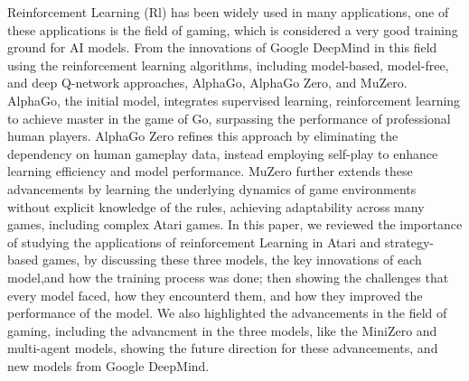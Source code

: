 Reinforcement Learning (Rl) has been widely used in many applications, one of
these applications is the field of gaming, which is considered a very good
training ground for AI models. From the innovations of Google DeepMind in this
field using the reinforcement learning algorithms, including model-based,
model-free, and deep Q-network approaches, AlphaGo, AlphaGo Zero, and MuZero.
AlphaGo, the initial model, integrates supervised learning, reinforcement
learning to achieve master in the game of Go, surpassing the performance of
professional human players. AlphaGo Zero refines this approach by eliminating
the dependency on human gameplay data, instead employing self-play to enhance
learning efficiency and model performance. MuZero further extends these
advancements by learning the underlying dynamics of game environments without
explicit knowledge of the rules, achieving adaptability across many games,
including complex Atari games. In this paper, we reviewed the importance of
studying the applications of reinforcement Learning in Atari and strategy-based
games, by discussing these three models, the key innovations of each model,and
how the training process was done; then showing the challenges that every model
faced, how they encounterd them, and how they improved the performance of the
model. We also highlighted the advancements in the field of gaming, including
the advancment in the three models, like the MiniZero and multi-agent models,
showing the future direction for these advancements, and new models from Google
DeepMind.